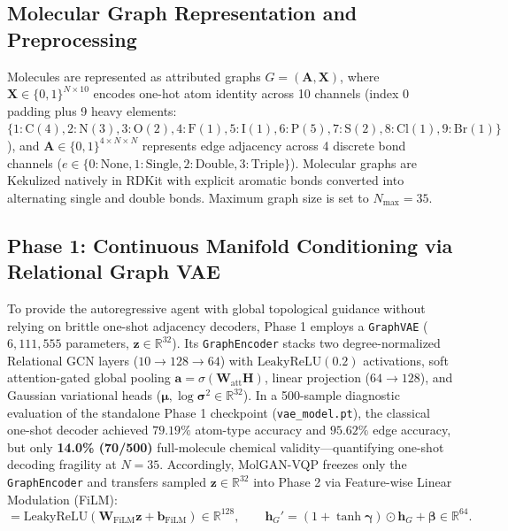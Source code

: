 \documentclass[10pt,a4paper]{article}
\begin{document}
\subsection{Molecular Graph Representation and Preprocessing}
Molecules are represented as attributed graphs $G = (\mathbf{A}, \mathbf{X})$, where $\mathbf{X} \in \{0, 1\}^{N \times 10}$ encodes one-hot atom identity across 10 channels (index $0$ padding plus 9 heavy elements: $\{1:\mathrm{C}(4), 2:\mathrm{N}(3), 3:\mathrm{O}(2), 4:\mathrm{F}(1), 5:\mathrm{I}(1), 6:\mathrm{P}(5), 7:\mathrm{S}(2), 8:\mathrm{Cl}(1), 9:\mathrm{Br}(1)\}$), and $\mathbf{A} \in \{0, 1\}^{4 \times N \times N}$ represents edge adjacency across 4 discrete bond channels ($e \in \{0:\text{None}, 1:\text{Single}, 2:\text{Double}, 3:\text{Triple}\}$). Molecular graphs are Kekulized natively in RDKit with explicit aromatic bonds converted into alternating single and double bonds. Maximum graph size is set to $N_{\max} = 35$.

\subsection{Phase 1: Continuous Manifold Conditioning via Relational Graph VAE}
To provide the autoregressive agent with global topological guidance without relying on brittle one-shot adjacency decoders, Phase 1 employs a \texttt{GraphVAE} ($6,111,555$ parameters, $\mathbf{z} \in \mathbb{R}^{32}$). Its \texttt{GraphEncoder} stacks two degree-normalized Relational GCN layers ($10 \to 128 \to 64$) with $\text{LeakyReLU}(0.2)$ activations, soft attention-gated global pooling $\mathbf{a} = \sigma(\mathbf{W}_{\text{att}}\mathbf{H})$, linear projection ($64 \to 128$), and Gaussian variational heads ($\boldsymbol{\mu}, \log\boldsymbol{\sigma}^2 \in \mathbb{R}^{32}$). In a 500-sample diagnostic evaluation of the standalone Phase 1 checkpoint (\texttt{vae\_model.pt}), the classical one-shot decoder achieved $79.19\%$ atom-type accuracy and $95.62\%$ edge accuracy, but only \textbf{14.0\% (70/500)} full-molecule chemical validity---quantifying one-shot decoding fragility at $N=35$. Accordingly, MolGAN-VQP freezes only the \texttt{GraphEncoder} and transfers sampled $\mathbf{z} \in \mathbb{R}^{32}$ into Phase 2 via Feature-wise Linear Modulation (FiLM):
\begin{equation}
[\boldsymbol{\gamma} \,\|\, \boldsymbol{\beta}] = \mathrm{LeakyReLU}(\mathbf{W}_{\text{FiLM}}\mathbf{z} + \mathbf{b}_{\text{FiLM}}) \in \mathbb{R}^{128}, \qquad \mathbf{h}_G' = (1 + \tanh\boldsymbol{\gamma}) \odot \mathbf{h}_G + \boldsymbol{\beta} \in \mathbb{R}^{64}.
\end{equation}
\end{document}
